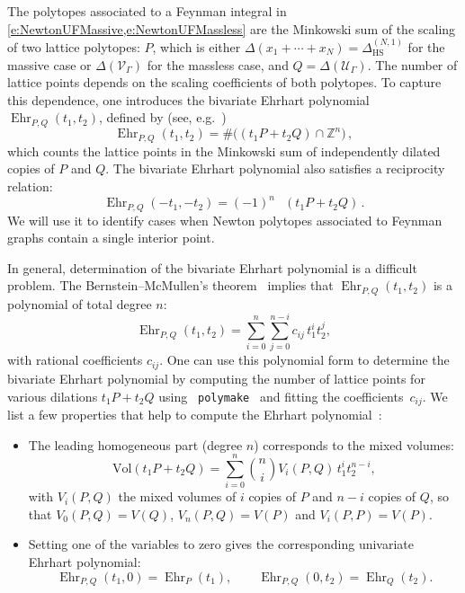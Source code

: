 \documentclass[12pt,a4paper]{article}
\theoremstyle{plain}
\theoremstyle{remark}
\newcommand{\nprops}{N}
\DeclareMathOperator{\nint}{N_{\mathrm{int}}}
\newcommand{\cU}{\mathscr {U}}
\newcommand{\cV}{\mathscr {V}}
\newcommand{\Newton}{\Delta}
\DeclareMathOperator{\ehr}{Ehr}
\newcommand{\simplexwithpars}[1]{\Newton_{\text{HS}}^{(#1)}}
\begin{document}
The polytopes associated to a Feynman integral in
\cref{e:NewtonUFMassive,e:NewtonUFMassless} are the Minkowski sum of
the scaling of  two lattice polytopes:
$P$, which is 
either $\Newton(x_1+\cdots+x_\nprops) = \simplexwithpars{\nprops,1}$ for the massive case or $\Newton(\cV_\Gamma)$ for the massless case, and $Q=\Newton(\cU_\Gamma)$.
The number of lattice points depends on the scaling coefficients of both polytopes. 
To capture this dependence, one introduces the bivariate Ehrhart
polynomial \( \ehr_{P,Q}(t_1,t_2) \), defined by (see, e.g.~\cite[Chap.~19.1]{Gruber2007})
\begin{equation}
\ehr_{P,Q}(t_1,t_2) = \# \big((t_1P+t_2 Q) \cap \mathbb{Z}^n \big)\,,
\end{equation}
which counts the lattice points in the Minkowski sum of independently
dilated copies of \(P\) and \(Q\). The bivariate Ehrhart polynomial also satisfies a reciprocity relation:
\begin{equation}\label{e:countInterior}
\ehr_{P,Q}(-t_1,-t_2) = (-1)^n\, 
\nint(t_1P+ t_2Q)\,.
\end{equation}
We will use it to identify cases when Newton polytopes associated to Feynman graphs contain a single interior point.

In general, determination of the bivariate
Ehrhart polynomial is a difficult problem. The
Bernstein--McMullen's theorem~\cite[Theorem~19.4]{Gruber2007} implies that \(\ehr_{P,Q}(t_1,t_2)\) is a polynomial of total degree \(n\):
\begin{equation}
\ehr_{P,Q}(t_1,t_2) = \sum_{i=0}^{n} \sum_{j=0}^{n-i} c_{ij}\, t_1^i t_2^j,
\end{equation}
with rational coefficients \(c_{ij}\).  One can use this polynomial
form to determine the bivariate Ehrhart polynomial by computing the number of lattice points for various dilations \(t_1 P + t_2 Q\) using {\tt
  polymake}~\cite{polymake:FPSAC_2009} and fitting the coefficients~\(c_{ij}\).
We list a few properties that help to compute the Ehrhart polynomial~\cite{Beck:2015,Haase:2017,BrandenburgEtAl:2020}:
\begin{itemize}
  \item 
The leading homogeneous part (degree \(n\)) corresponds to the mixed volumes:
\begin{equation}
\mathrm{Vol}(t_1P + t_2 Q)
= \sum_{i=0}^{n} \binom{n}{i} V_i(P,Q)\, t_1^i t_2^{n-i},
\end{equation}
with $V_i(P,Q)$ the mixed volumes of $i$ copies of $P$ and $n-i$ copies of $Q$, so that $V_0(P,Q)=V(Q)$, $V_n(P,Q)=V(P)$ and $V_i(P,P)=V(P)$. 
\item Setting one of the variables to zero gives the corresponding univariate Ehrhart polynomial:
\begin{equation}
\ehr_{P,Q}(t_1,0) = \ehr_P(t_1), \qquad \ehr_{P,Q}(0,t_2) = \ehr_Q(t_2).
\end{equation}
\end{itemize}
\end{document}
